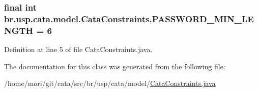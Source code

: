 \hypertarget{classbr_1_1usp_1_1cata_1_1model_1_1_cata_constraints_af46781448afc5578a25567594ed26b0d}{
\subsubsection[{P\+A\+S\+S\+W\+O\+R\+D\+\_\+\+M\+I\+N\+\_\+\+L\+E\+N\+G\+T\+H}]{\setlength{\rightskip}{0pt plus 5cm}final int br.\+usp.\+cata.\+model.\+Cata\+Constraints.\+P\+A\+S\+S\+W\+O\+R\+D\+\_\+\+M\+I\+N\+\_\+\+L\+E\+N\+G\+T\+H = 6\hspace{0.3cm}{\ttfamily [static]}}}\label{classbr_1_1usp_1_1cata_1_1model_1_1_cata_constraints_af46781448afc5578a25567594ed26b0d}


Definition at line 5 of file Cata\+Constraints.\+java.



The documentation for this class was generated from the following file\+:\begin{DoxyCompactItemize}
\item 
/home/mori/git/cata/src/br/usp/cata/model/\hyperlink{_cata_constraints_8java}{Cata\+Constraints.\+java}\end{DoxyCompactItemize}
